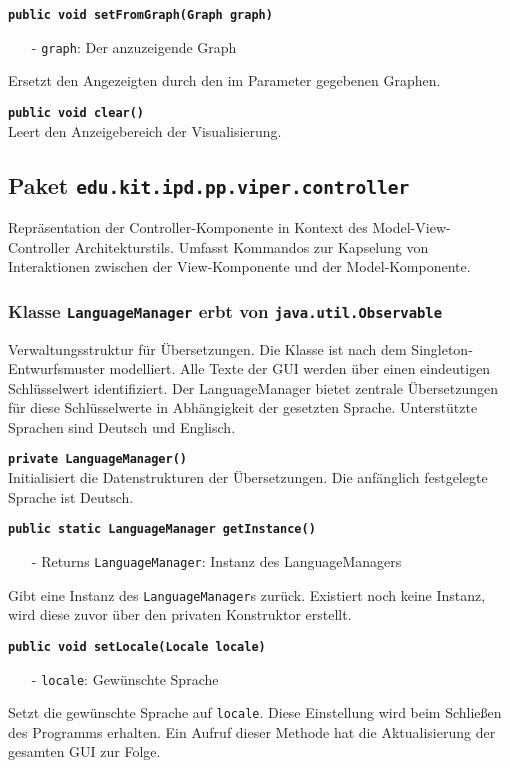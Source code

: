 \documentclass[parskip=full,11pt,twoside]{scrartcl}
\begin{document}
\textbf{\texttt{public void setFromGraph(Graph graph)}}
\begin{itemize}[noitemsep]
	\item[-] \texttt{graph}: Der anzuzeigende Graph
\end{itemize}
Ersetzt den Angezeigten durch den im Parameter gegebenen Graphen.

\textbf{\texttt{public void clear()}}\\
Leert den Anzeigebereich der Visualisierung.

\newpage
\subsection{Paket \texttt{edu.kit.ipd.pp.viper.controller}}

Repräsentation der Controller-Komponente in Kontext des Model-View-Controller Architekturstils. Umfasst Kommandos zur Kapselung von Interaktionen zwischen der View-Komponente und der Model-Komponente.

\subsubsection{Klasse \texttt{LanguageManager} erbt von \texttt{java.util.Observable}}

Verwaltungsstruktur für Übersetzungen. Die Klasse ist nach dem Singleton-Entwurfsmuster modelliert. Alle Texte der GUI werden über einen eindeutigen Schlüsselwert identifiziert. Der LanguageManager bietet zentrale Übersetzungen für diese Schlüsselwerte in Abhängigkeit der gesetzten Sprache. Unterstützte Sprachen sind Deutsch und Englisch.

\textbf{\texttt{private LanguageManager()}}\\
Initialisiert die Datenstrukturen der Übersetzungen. Die anfänglich festgelegte Sprache ist Deutsch.

\textbf{\texttt{public static LanguageManager getInstance()}}
\begin{itemize}[noitemsep]
	\item[-] Returns \texttt{LanguageManager}: Instanz des LanguageManagers
\end{itemize}
Gibt eine Instanz des \texttt{LanguageManager}s zurück. Existiert noch keine Instanz, wird diese zuvor über den privaten Konstruktor erstellt.

\textbf{\texttt{public void setLocale(Locale locale)}}
\begin{itemize}[noitemsep]
	\item[-] \texttt{locale}: Gewünschte Sprache
\end{itemize}
Setzt die gewünschte Sprache auf \texttt{locale}. Diese Einstellung wird beim Schließen des Programms erhalten. Ein Aufruf dieser Methode hat die Aktualisierung der gesamten GUI zur Folge.
\end{document}

